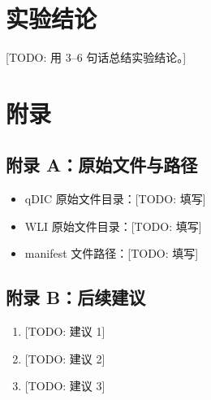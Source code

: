 \documentclass[UTF8,a4paper,11pt]{ctexart}
\newcommand{\TODO}[1]{\textcolor{red!70!black}{[TODO: #1]}}
\begin{document}
\section{实验结论}

\TODO{用 3--6 句话总结实验结论。}

\section{附录}

\subsection{附录 A：原始文件与路径}

\begin{itemize}
  \item qDIC 原始文件目录：\TODO{填写}
  \item WLI 原始文件目录：\TODO{填写}
  \item manifest 文件路径：\TODO{填写}
\end{itemize}

\subsection{附录 B：后续建议}

\begin{enumerate}
  \item \TODO{建议 1}
  \item \TODO{建议 2}
  \item \TODO{建议 3}
\end{enumerate}
\end{document}
